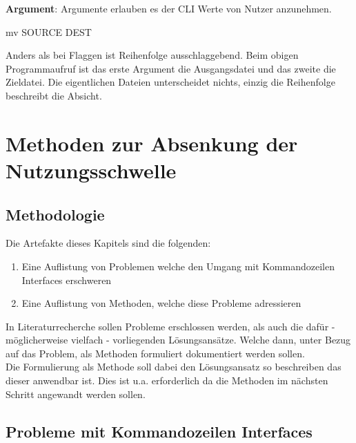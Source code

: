 \documentclass[oneside,bibliography=totocnumbered,BCOR=5mm]{scrbook}
\newenvironment{code}{\captionsetup{type=listing, skip=0pt}}{}
\begin{document}
\textbf{Argument}: Argumente erlauben es der CLI Werte von Nutzer anzunehmen.

\begin{code}
  \begin{shellcode}
mv SOURCE DEST
  \end{shellcode}
  \medskip
\end{code}

Anders als bei Flaggen ist Reihenfolge ausschlaggebend. Beim obigen
 Programmaufruf ist das erste Argument die Ausgangsdatei und das
zweite die Zieldatei. Die eigentlichen Dateien unterscheidet nichts, einzig die
Reihenfolge beschreibt die Absicht.



\chapter{Methoden zur Absenkung der Nutzungsschwelle}

\section{Methodologie}

Die Artefakte dieses Kapitels sind die folgenden:
\begin{enumerate}
  \item Eine Auflistung von Problemen welche den Umgang mit Kommandozeilen Interfaces erschweren
  \item Eine Auflistung von Methoden, welche diese Probleme adressieren
\end{enumerate}

In Literaturrecherche sollen Probleme erschlossen werden, als auch die dafür -
möglicherweise vielfach - vorliegenden Lösungsansätze. Welche dann, unter Bezug
auf das Problem, als Methoden formuliert dokumentiert werden sollen.
\\
Die Formulierung als Methode soll dabei den Lösungsansatz so beschreiben das
dieser anwendbar ist. Dies ist u.a. erforderlich da die Methoden im nächsten
Schritt angewandt werden sollen.

\section{Probleme mit Kommandozeilen Interfaces}
\end{document}
